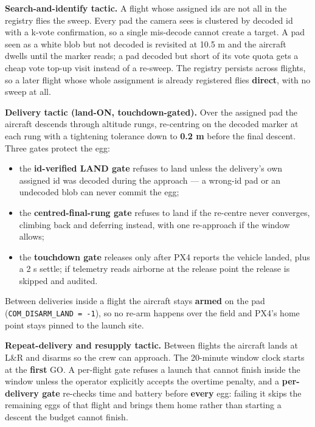 \documentclass[
  10pt,
  a4paper,
  titlepage]{article}
\providecommand{\tightlist}{%
  \setlength{\itemsep}{0pt}\setlength{\parskip}{0pt}}
\begin{document}
\textbf{Search-and-identify tactic.} A flight whose assigned ids are not
all in the registry flies the sweep. Every pad the camera sees is
clustered by decoded id with a k-vote confirmation, so a single
mis-decode cannot create a target. A pad seen as a white blob but not
decoded is revisited at 10.5 m and the aircraft dwells until the marker
reads; a pad decoded but short of its vote quota gets a cheap vote
top-up visit instead of a re-sweep. The registry persists across
flights, so a later flight whose whole assignment is already registered
flies \textbf{direct}, with no sweep at all.

\textbf{Delivery tactic (land-ON, touchdown-gated).} Over the assigned
pad the aircraft descends through altitude rungs, re-centring on the
decoded marker at each rung with a tightening tolerance down to
\textbf{0.2 m} before the final descent. Three gates protect the egg:

\begin{itemize}
\tightlist
\item
  the \textbf{id-verified LAND gate} refuses to land unless the
  delivery's own assigned id was decoded during the approach --- a
  wrong-id pad or an undecoded blob can never commit the egg;
\item
  the \textbf{centred-final-rung gate} refuses to land if the re-centre
  never converges, climbing back and deferring instead, with one
  re-approach if the window allows;
\item
  the \textbf{touchdown gate} releases only after PX4 reports the
  vehicle landed, plus a 2 s settle; if telemetry reads airborne at the
  release point the release is skipped and audited.
\end{itemize}

Between deliveries inside a flight the aircraft stays \textbf{armed} on
the pad (\texttt{COM\_DISARM\_LAND\ =\ -1}), so no re-arm happens over
the field and PX4's home point stays pinned to the launch site.

\textbf{Repeat-delivery and resupply tactic.} Between flights the
aircraft lands at L\&R and disarms so the crew can approach. The
20-minute window clock starts at the \textbf{first} GO. A per-flight
gate refuses a launch that cannot finish inside the window unless the
operator explicitly accepts the overtime penalty, and a
\textbf{per-delivery gate} re-checks time and battery before
\textbf{every} egg: failing it skips the remaining eggs of that flight
and brings them home rather than starting a descent the budget cannot
finish.
\end{document}
